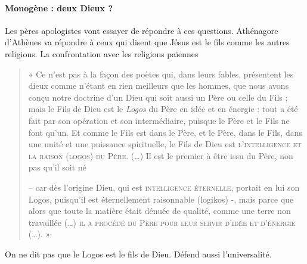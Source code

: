 \paragraph{Monogène : deux Dieux ?} Les pères apologistes vont essayer de répondre à ces questions. 
Athénagore d'Athènes  va répondre à ceux qui disent que Jésus est le fils comme les autres religions. La confrontation avec les religions païennes
\begin{quote}
« Ce n'est pas à la façon des poètes qui, dans leurs fables, présentent
les dieux comme n'étant en rien meilleurs que les hommes, que nous avons
conçu notre doctrine d'un Dieu qui soit aussi un Père ou celle du Fils ;
mais le Fils de Dieu est le \emph{Logos} du Père en idée et en énergie :
tout a été fait par son opération et son intermédiaire, puisque le Père
et le Fils ne font qu'un. Et comme le Fils est dans le Père, et le Père,
dans le Fils, dans une unité et une puissance spirituelle, le Fils de
Dieu est \textsc{l'intelligence et la raison (logos) du Père.}
(\ldots) Il est le premier à être issu du Père, non pas qu'il soit né

-- car dès l'origine Dieu, qui est \textsc{intelligence éternelle},
portait en lui son Logos, puisqu'il est éternellement raisonnable
(logikos) -, mais parce que alors que toute la matière était dénuée de
qualité, comme une terre non travaillée (\ldots) \textsc{il a procédé
du Père pour leur servir d'idée et d'énergie} (\ldots). »

\end{quote}
On ne dit pas que le Logos est le fils de Dieu. Défend aussi l'universalité. 

